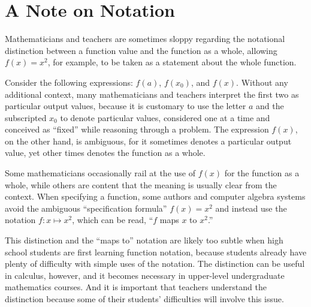 \section{A Note on Notation}

Mathematicians and teachers are sometimes sloppy regarding the
notational distinction between a function value and the function as a
whole, allowing $f(x)=x^2$, for example, to be taken as a statement
about the whole function.

Consider the following expressions: $f(a)$, $f(x_0)$, and $f(x)$.
Without any additional context, many mathematicians and teachers
interpret the first two as particular output values, because it is
customary to use the letter $a$ and the subscripted $x_0$ to denote
particular values, considered one at a time and conceived as ``fixed''
while reasoning through a problem.  The expression $f(x)$, on the
other hand, is ambiguous, for it sometimes denotes a particular output
value, yet other times denotes the function as a whole.

Some mathematicians occasionally rail at the use of $f(x)$ for the
function as a whole, while others are content that the meaning is
usually clear from the context.  When specifying a function, some
authors and computer algebra systems avoid the ambiguous
``specification formula'' $f(x)=x^2$ and instead use the notation $f:
x\mapsto x^2$, which can be read, ``$f$ maps $x$ to $x^2$.''

This distinction and the ``maps to'' notation are likely too subtle
when high school students are first learning function notation,
because students already have plenty of difficulty with simple uses of
the notation.  The distinction can be useful in calculus, however, and
it becomes necessary in upper-level undergraduate mathematics courses.
And it is important that teachers understand the distinction because
some of their students' difficulties will involve this issue.
